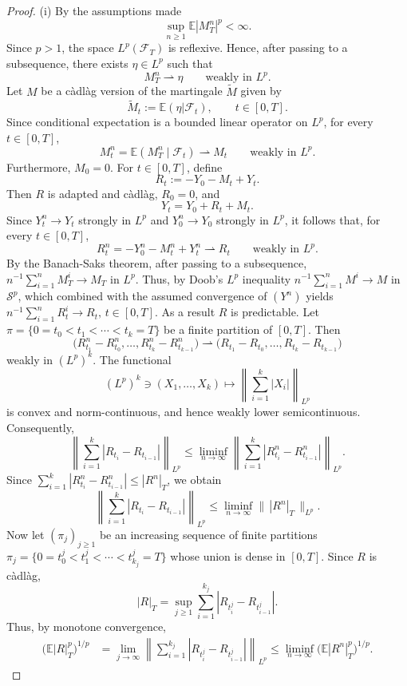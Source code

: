 \documentclass[11pt,a4paper,reqno]{amsart}
\theoremstyle{definition}
\numberwithin{equation}{section}
\begin{document}
\begin{proof}
(i) By the assumptions made
\[
\sup_{n\geq1}\mathbb E|M^n_T|^p<\infty.
\]
Since $p>1$, the space $L^p(\mathcal F_T)$ is
reflexive. Hence, after passing to a subsequence, there exists
$\eta\in L^p$ such that
\[
M^n_T\rightharpoonup\eta
\qquad\text{weakly in }L^p.
\]
Let $M$ be a c\`adl\`ag version of the martingale $\tilde M$ given by 
\[
\tilde M_t:=\mathbb E(\eta|\mathcal F_t),\qquad t\in[0,T].
\]
Since conditional expectation is a bounded linear operator on $L^p$,
for every $t\in[0,T]$,
\[
M^n_t
=
\mathbb E(M^n_T\mid\mathcal F_t)
\rightharpoonup
M_t
\qquad\text{weakly in }L^p.
\]
Furthermore, $M_0=0$. For $t\in[0,T]$, define
\[
R_t:=-Y_0-M_t+Y_t.
\]
Then $R$ is adapted and c\`adl\`ag, $R_0=0$, and
\[
Y_t=Y_0+R_t+M_t.
\]
Since $Y^n_t\to Y_t$ strongly in $L^p$ and $Y^n_0\to Y_0$ strongly
in $L^p$, it follows that, for every $t\in[0,T]$,
\[
R^n_t
=
-Y^n_0-M^n_t+Y^n_t
\rightharpoonup
R_t
\qquad\text{weakly in }L^p.
\]
By the Banach-Saks theorem, after passing to a subsequence, $n^{-1}\sum_{i=1}^nM^i_T\to M_T$
in $L^p$. Thus, by Doob's $L^p$ inequality   $n^{-1}\sum_{i=1}^nM^i\to M$ in $\mathcal S^p$, which combined with
the assumed convergence of $(Y^n)$ yields   $n^{-1}\sum_{i=1}^nR^i_t\to R_t,\, t\in [0,T]$. As a result $R$ is predictable.
Let $\pi=\{0=t_0<t_1<\cdots<t_k=T\}$
be a finite partition of $[0,T]$. Then
\[
\big(
R^n_{t_1}-R^n_{t_0},\ldots,
R^n_{t_k}-R^n_{t_{k-1}}
\big)
\rightharpoonup
\big(
R_{t_1}-R_{t_0},\ldots,
R_{t_k}-R_{t_{k-1}}
\big)
\]
weakly in $(L^p)^k$. The functional
\[
(L^p)^k\ni(X_1,\ldots,X_k)
\longmapsto
\left\|
\sum_{i=1}^k|X_i|
\right\|_{L^p}
\]
is convex and norm-continuous, and hence weakly lower
semicontinuous. Consequently,
\[
\left\|
\sum_{i=1}^k|R_{t_i}-R_{t_{i-1}}|
\right\|_{L^p}
\leq
\liminf_{n\to\infty}
\left\|
\sum_{i=1}^k|R^n_{t_i}-R^n_{t_{i-1}}|
\right\|_{L^p}.
\]
Since $\sum_{i=1}^k|R^n_{t_i}-R^n_{t_{i-1}}|\leq |R^n|_T$,
we obtain
\[
\left\|
\sum_{i=1}^k|R_{t_i}-R_{t_{i-1}}|
\right\|_{L^p}
\leq
\liminf_{n\to\infty}\|\,|R^n|_T\,\|_{L^p}.
\]
Now let $(\pi_j)_{j\geq1}$ be an increasing sequence of finite
partitions $\pi_j=\{0=t^j_0<t^j_1<\cdots<t^j_{k_j}=T\}$
whose union is dense in $[0,T]$.
Since $R$ is c\`adl\`ag,
\[
|R|_T
=
\sup_{j\geq1}
\sum_{i=1}^{k_j}|R_{t^j_i}-R_{t^j_{i-1}}|.
\]
Thus, by monotone convergence,
\[
\begin{split}
\big(\mathbb E|R|_T^p\big)^{1/p}
&=
\lim_{j\to\infty}
\left\|\sum_{i=1}^{k_j}|R_{t^j_i}-R_{t^j_{i-1}}|\right\|_{L^p}\leq
\liminf_{n\to\infty}
\big(\mathbb E|R^n|_T^p\big)^{1/p}.
\end{split}
\]


\end{proof}
\end{document}
